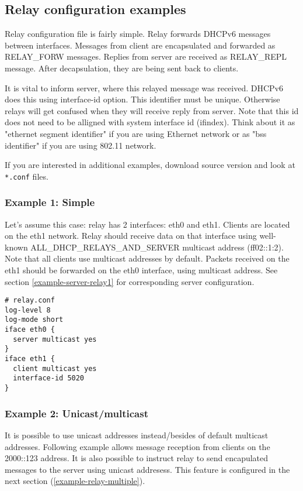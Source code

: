 \subsection{Relay configuration examples}
\label{example-relay}

Relay configuration file is fairly simple. Relay forwards DHCPv6
messages between interfaces. Messages from client are encapsulated and
forwarded as RELAY\_FORW messages. Replies from server are received as
RELAY\_REPL message. After decapsulation, they are being sent back to
clients.

It is vital to inform server, where this relayed message was
received. DHCPv6 does this using interface-id option. This identifier
must be unique. Otherwise relays will get confused when they will
receive reply from server. Note that this id does not need to be
alligned with system interface id (ifindex). Think about it as
"ethernet segment identifier" if you are using Ethernet network or as
"bss identifier" if you are using 802.11 network.

If you are interested in additional examples, download source version
and look at \verb+*.conf+ files.

\subsubsection{Example 1: Simple}
\label{example-relay-1}
Let's assume this case: relay has 2 interfaces: eth0 and
eth1. Clients are located on the eth1 network. Relay should receive
data on that interface using well-known ALL\_DHCP\_RELAYS\_AND\_SERVER
multicast address (ff02::1:2). Note that all clients use multicast
addresses by default. Packets received on the eth1 should be
forwarded on the eth0 interface, using multicast address. See section
\ref{example-server-relay1} for corresponding server configuration.

\begin{lstlisting}
# relay.conf
log-level 8
log-mode short
iface eth0 {
  server multicast yes
}
iface eth1 {
  client multicast yes
  interface-id 5020
}
\end{lstlisting}

\subsubsection{Example 2: Unicast/multicast}
It is possible to use unicast addresses instead/besides of default
multicast addresses. Following example allows message reception from
clients on the 2000::123 address. It is also possible to instruct
relay to send encapulated messages to the server using unicast
addresess. This feature is configured in the next section
(\ref{example-relay-multiple}).


